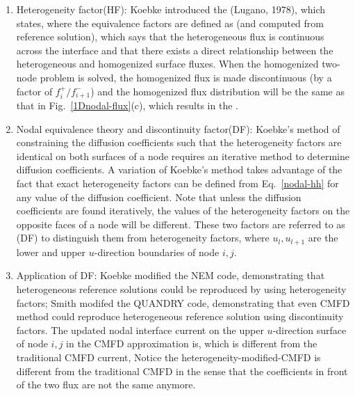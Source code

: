 \documentclass{school-22.211-notes}
\begin{document}
\begin{enumerate}
\item Heterogeneity factor(HF): Koebke introduced the (Lugano, 1978), which states,
where the equivalence factors are defined as (and computed from reference solution), 
which says that the heterogeneous flux is continuous across the interface and that there exists a direct relationship between the heterogeneous and homogenized surface fluxes. When the homogenized two-node problem is solved, the homogenized flux is made discontinuous (by a factor of $f_i^+/f_{i+1}^-$) and the homogenized flux distribution will be the same as that in Fig.~\ref{1Dnodal-flux}(c), which results in the . 

\item Nodal equivalence theory and discontinuity factor(DF): Koebke's method of constraining the diffusion coefficients such that the heterogeneity factors are identical on both surfaces of a node requires an iterative method to determine diffusion coefficients. A variation of Koebke's method takes advantage of the fact that exact heterogeneity factors can be defined from Eq.~\ref{nodal-hh} for any value of the diffusion coefficient. Note that unless the diffusion coefficients are found iteratively, the values of the heterogeneity factors on the opposite faces of a node will be different. These two factors are referred to as (DF) to distinguish them from heterogeneity factors, 
  where $u_l, u_{l+1}$ are the lower and upper $u$-direction boundaries of node $i,j$. 

\item Application of DF: Koebke modified the NEM code, demonstrating that heterogeneous reference solutions could be reproduced by using heterogeneity factors; Smith modifed the QUANDRY code, demonstrating that even CMFD method could reproduce heterogeneous reference solution using discontinuity factors. The updated nodal interface current on the upper $u$-direction surface of node $i,j$ in the CMFD approximation is,
  which is different from the traditional CMFD current, 
  Notice the heterogeneity-modified-CMFD is different from the traditional CMFD in the sense that the coefficients in front of the two flux are not the same anymore. 


\end{enumerate}
\end{document}
